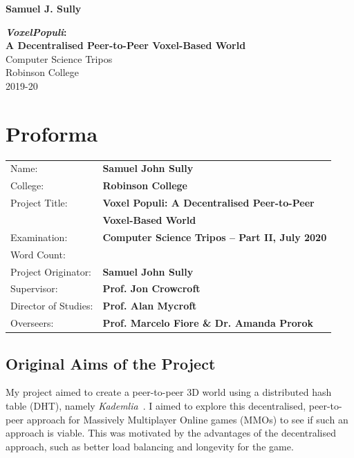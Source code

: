 \documentclass[10pt,twoside,notitlepage,a4paper]{report}
\newcommand{\kademlia}{\emph{Kademlia}}
\newcommand{\voxpop}{\emph{VoxelPopuli}}
\begin{document}
	
	
	\pagestyle{empty}
	
	\hfill{\LARGE \bf Samuel J. Sully}
	
	\vspace*{60mm}
	\begin{center}
		\Huge
		{\bf \voxpop:\\ A Decentralised Peer-to-Peer Voxel-Based World} \\
		\vspace*{5mm}
		Computer Science Tripos \\
		\vspace*{5mm}
		Robinson College \\
		\vspace*{5mm}
		2019-20
	\end{center}
	
	\cleardoublepage
	
	\setcounter{page}{1}
	\pagestyle{plain}
	
	\chapter*{Proforma}
	
	{\large
		\begin{tabular}{ll}
			Name:               & \bf Samuel John Sully\\
			College:            & \bf Robinson College\\
			Project Title:      & \bf Voxel Populi: A Decentralised Peer-to-Peer\\ 
								& \bf Voxel-Based World\\
			Examination:        & \bf Computer Science Tripos -- Part II, July 2020\\
			Word Count:         & \bf \footnotemark[1]\\
			Project Originator: & \bf Samuel John Sully\\
			Supervisor:         & \bf Prof. Jon Crowcroft\\
			Director of Studies:& \bf Prof. Alan Mycroft\\
			Overseers:          & \bf Prof. Marcelo Fiore \& Dr. Amanda Prorok 
		\end{tabular}
	}
	
	\section*{Original Aims of the Project}
	My project aimed to create a peer-to-peer 3D world using a distributed hash table (DHT), namely \kademlia{}~\cite{kademlia}. I aimed to explore this decentralised, peer-to-peer approach for Massively Multiplayer Online games (MMOs) to see if such an approach is viable. This was motivated by the advantages of the decentralised approach, such as better load balancing and longevity for the game.
	
\end{document}
